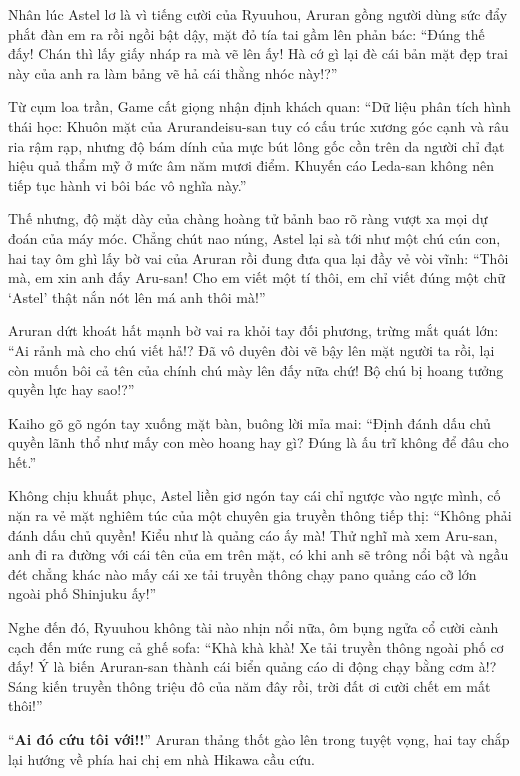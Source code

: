 \documentclass[../main.tex]{subfiles}
\begin{document}
Nhân lúc Astel lơ là vì tiếng cười của Ryuuhou, Aruran gồng người dùng sức đẩy phắt đàn em ra rồi ngồi bật dậy, mặt đỏ tía tai gầm lên phản bác: ``Đúng thế đấy! Chán thì lấy giấy nháp ra mà vẽ lên ấy! Hà cớ gì lại đè cái bản mặt đẹp trai này của anh ra làm bảng vẽ hả cái thằng nhóc này!?''

Từ cụm loa trần, Game cất giọng nhận định khách quan: ``Dữ liệu phân tích hình thái học: Khuôn mặt của Arurandeisu-san tuy có cấu trúc xương góc cạnh và râu ria rậm rạp, nhưng độ bám dính của mực bút lông gốc cồn trên da người chỉ đạt hiệu quả thẩm mỹ ở mức âm năm mươi điểm. Khuyến cáo Leda-san không nên tiếp tục hành vi bôi bác vô nghĩa này.''

Thế nhưng, độ mặt dày của chàng hoàng tử bảnh bao rõ ràng vượt xa mọi dự đoán của máy móc. Chẳng chút nao núng, Astel lại sà tới như một chú cún con, hai tay ôm ghì lấy bờ vai của Aruran rồi đung đưa qua lại đầy vẻ vòi vĩnh: ``Thôi mà, em xin anh đấy Aru-san! Cho em viết một tí thôi, em chỉ viết đúng một chữ `Astel' thật nắn nót lên má anh thôi mà!''

Aruran dứt khoát hất mạnh bờ vai ra khỏi tay đối phương, trừng mắt quát lớn: ``Ai rảnh mà cho chú viết hả!? Đã vô duyên đòi vẽ bậy lên mặt người ta rồi, lại còn muốn bôi cả tên của chính chú mày lên đấy nữa chứ! Bộ chú bị hoang tưởng quyền lực hay sao!?''

Kaiho gõ gõ ngón tay xuống mặt bàn, buông lời mỉa mai: ``Định đánh dấu chủ quyền lãnh thổ như mấy con mèo hoang hay gì? Đúng là ấu trĩ không để đâu cho hết.''

Không chịu khuất phục, Astel liền giơ ngón tay cái chỉ ngược vào ngực mình, cố nặn ra vẻ mặt nghiêm túc của một chuyên gia truyền thông tiếp thị: ``Không phải đánh dấu chủ quyền! Kiểu như là quảng cáo ấy mà! Thử nghĩ mà xem Aru-san, anh đi ra đường với cái tên của em trên mặt, có khi anh sẽ trông nổi bật và ngầu đét chẳng khác nào mấy cái xe tải truyền thông chạy pano quảng cáo cỡ lớn ngoài phố Shinjuku ấy!''

Nghe đến đó, Ryuuhou không tài nào nhịn nổi nữa, ôm bụng ngửa cổ cười cành cạch đến mức rung cả ghế sofa: ``Khà khà khà! Xe tải truyền thông ngoài phố cơ đấy! Ý là biến Aruran-san thành cái biển quảng cáo di động chạy bằng cơm à!? Sáng kiến truyền thông triệu đô của năm đây rồi, trời đất ơi cười chết em mất thôi!''

``\textbf{Ai đó cứu tôi với!!}'' Aruran thảng thốt gào lên trong tuyệt vọng, hai tay chắp lại hướng về phía hai chị em nhà Hikawa cầu cứu.
\end{document}
